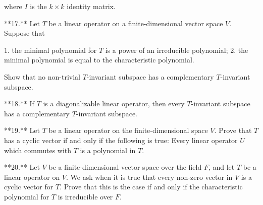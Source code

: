 where \(I\) is the \(k\times k\) identity matrix.

**17.** Let \(T\) be a linear operator on a finite-dimensional vector space \(V\). Suppose that

1. the minimal polynomial for \(T\) is a power of an irreducible polynomial;
2. the minimal polynomial is equal to the characteristic polynomial.

Show that no non-trivial \(T\)-invariant subspace has a complementary \(T\)-invariant subspace.

**18.** If \(T\) is a diagonalizable linear operator, then every \(T\)-invariant subspace has a complementary \(T\)-invariant subspace.

**19.** Let \(T\) be a linear operator on the finite-dimensional space \(V\). Prove that \(T\) has a cyclic vector if and only if the following is true: Every linear operator \(U\) which commutes with \(T\) is a polynomial in \(T\).

**20.** Let \(V\) be a finite-dimensional vector space over the field \(F\), and let \(T\) be a linear operator on \(V\). We ask when it is true that every non-zero vector in \(V\) is a cyclic vector for \(T\). Prove that this is the case if and only if the characteristic polynomial for \(T\) is irreducible over \(F\).

 